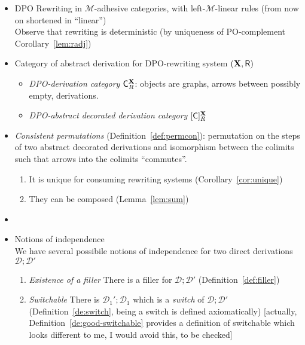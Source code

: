 \documentclass[a4paper]{article}
\newcommand{\dpo}{\textsc{dpo}}
\def\R{\mathsf{R}}
\def\X{\textbf {\textup{X}}}
\newcommand{\dder}[1]{\mathscr{#1}}
\def\dpo{\mathsf{C}^{\X}_R}
\def\dpi{[\mathsf{C}]^{\X}_R}
\theoremstyle{definition}
\begin{document}
\begin{itemize}
\item DPO Rewriting in $\mathcal{M}$-adhesive categories, with left-$\mathcal{M}$-linear rules (from now on shortened in ``linear'')\\
  Observe that rewriting is deterministic (by uniqueness of
  PO-complement Corollary~\ref{lem:radj})
  
\item Category of abstract derivation for DPO-rewriting system $(\X, \R)$
  \begin{itemize}
  \item \emph{DPO-derivation category} $\dpo$: objects are graphs, arrows between possibly empty, derivations.
  \item \emph{DPO-abstract decorated derivation category} $\dpi$
  \end{itemize}



\item \emph{Consistent permutations} (Definition~\ref{def:permcon}):
  permutation on the steps of two abstract decorated derivations and isomorphism between the colimits such
  that arrows into the colimits ``commutes''.
  \begin{enumerate}
  \item It is unique for consuming rewriting systems
    (Corollary~\ref{cor:unique})
  \item They can be composed (Lemma~\ref{lem:sum})
  \end{enumerate}
\item 

  
\item Notions of independence\\
  We have several possibile notions of independence for two direct
  derivations $\dder{D} ; \dder{D'}$
  \begin{enumerate}
    
  \item \emph{Existence of a filler}
    There is a filler for $\dder{D} ; \dder{D'}$
    (Definition~\ref{def:filler})

  \item \emph{Switchable}
    There is $\dder{D}_1' ; \dder{D}_1$ which is a \emph{switch}
    of $\dder{D} ; \dder{D'}$ (Definition~\ref{de:switch}, being a
    switch is defined axiomatically) [actually, Definition~\ref{de:good-switchable} provides a definition of switchable which looks different to me, I would avoid this, to be checked] 


\end{enumerate}
\end{itemize}
\end{document}

